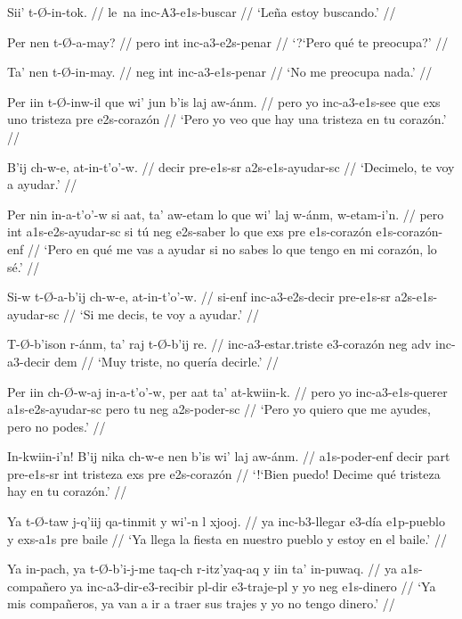 \documentclass[12pt]{article}
\begin{document}
\ex
\begingl
  \gla  Sii' t-\O-in-tok. //
  \glb le~na inc-A3-e1s-buscar //
  \glft `Le\~na estoy buscando.' //
\endgl
\xe

\ex
\begingl
  \gla  Per nen t-\O-a-may? //
  \glb pero int inc-a3-e2s-penar //
  \glft `?`Pero qu\'e te preocupa?' //
\endgl
\xe

\ex
\begingl
  \gla  Ta' nen t-\O-in-may. //
  \glb neg int inc-a3-e1s-penar //
  \glft `No me preocupa nada.' //
\endgl
\xe


\ex
\begingl
  \gla Per iin t-\O-inw-il que wi' jun b'is laj aw-\'anm. //
  \glb pero yo inc-a3-e1s-see que exs uno tristeza pre e2s-coraz\'on //
  \glft `Pero yo veo que hay una tristeza en tu coraz\'on.' //
\endgl
\xe

\ex
\begingl
  \gla  B'ij ch-w-e, at-in-t'o'-w. //
  \glb decir pre-e1s-sr a2s-e1s-ayudar-sc //
  \glft `Decimelo, te voy a ayudar.' //
\endgl
\xe

\ex
\begingl
  \gla  Per nin in-a-t'o'-w si aat, ta' aw-etam lo que wi' laj w-\'anm, w-etam-i'n. //
  \glb pero int a1s-e2s-ayudar-sc si t\'u neg e2s-saber lo que exs pre e1s-coraz\'on e1s-coraz\'on-enf //
  \glft `Pero en qu\'e me vas a ayudar si no sabes lo que tengo en mi coraz\'on, lo s\'e.' //
\endgl
\xe

\ex
\begingl
  \gla  Si-w t-\O-a-b'ij ch-w-e, at-in-t'o'-w. //
  \glb  si-enf inc-a3-e2s-decir pre-e1s-sr a2s-e1s-ayudar-sc //
  \glft `Si me decis, te voy a ayudar.' //
\endgl
\xe

\ex
\begingl
  \gla  T-\O-b'ison r-\'anm, ta' raj t-\O-b'ij re. //
  \glb inc-a3-estar.triste e3-coraz\'on neg adv inc-a3-decir dem //
  \glft `Muy triste, no quer\'ia decirle.' //
\endgl
\xe

\ex
\begingl
  \gla Per iin ch-\O-w-aj in-a-t'o'-w, per aat ta' at-kwiin-k. //
  \glb pero yo inc-a3-e1s-querer a1s-e2s-ayudar-sc pero tu neg a2s-poder-sc //
  \glft `Pero yo quiero que me ayudes, pero no podes.' //
\endgl
\xe

\ex
\begingl
  \gla In-kwiin-i'n! B'ij nika ch-w-e nen b'is wi' laj aw-\'anm. //
  \glb a1s-poder-enf decir part pre-e1s-sr int tristeza exs pre e2s-coraz\'on //
  \glft `!`Bien puedo! Decime qu\'e tristeza hay en tu coraz\'on.' //
\endgl
\xe

\ex
\begingl
  \gla  Ya t-\O-taw j-q'iij qa-tinmit y wi'-n l xjooj. //
  \glb ya inc-b3-llegar  e3-d\'ia e1p-pueblo y exs-a1s pre baile //
  \glft `Ya llega la fiesta en nuestro pueblo y estoy en el baile.' //
\endgl
\xe

\ex
\begingl
  \gla  Ya in-pach, ya t-\O-b'i-j-me taq-ch r-itz'yaq-aq y iin ta' in-puwaq. //
  \glb ya a1s-compa\~nero ya inc-a3-dir-e3-recibir pl-dir e3-traje-pl y yo neg e1s-dinero //
  \glft `Ya mis compa\~neros, ya van a ir a traer sus trajes y yo no tengo dinero.' //
\endgl
\xe
\end{document}
